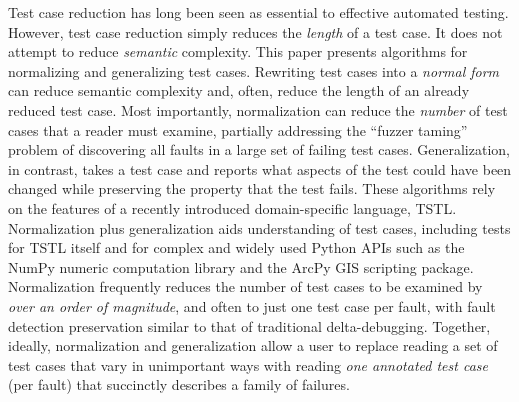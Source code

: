 Test case reduction has long been seen as essential to effective automated testing.  However, test case reduction simply reduces the \emph{length} of a test case.  It does not attempt to reduce \emph{semantic} complexity.  This paper presents algorithms for normalizing and generalizing test cases.  Rewriting test cases into a \emph{normal form} can reduce semantic complexity and, often, reduce the length of an already reduced test case.  Most importantly, normalization can reduce the \emph{number} of test cases that a reader must examine, partially addressing the ``fuzzer taming'' problem of discovering all faults in a large set of failing test cases.  Generalization, in contrast, takes a test case and reports what aspects of the test could have been changed while preserving the property that the test fails.  These algorithms rely on the features of a recently introduced domain-specific language, TSTL.  Normalization plus generalization aids understanding of test cases, including tests for TSTL itself and for complex and widely used Python APIs such as the NumPy numeric computation library and the ArcPy GIS scripting package.  Normalization frequently reduces the number of test cases to be examined by \emph{over an order of magnitude}, and often to just one test case per fault, with fault detection preservation similar to that of traditional delta-debugging.  Together, ideally, normalization and generalization allow a user to replace reading a set of test cases that vary in unimportant ways with reading \emph{one annotated test case} (per fault) that succinctly describes a family of failures. 